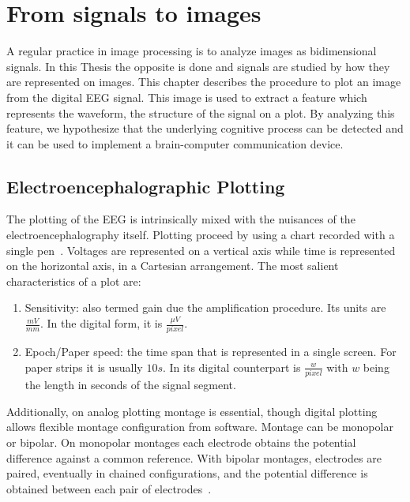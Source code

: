 \chapter{From signals to images}
\label{chapter:two}


A regular practice in image processing is to analyze images as bidimensional signals.  In this Thesis the opposite is done and signals are studied by how they are represented on images. This chapter describes the procedure to plot an image from the digital EEG signal.  This image is used to extract a feature which represents the waveform, the structure of the signal on a plot.  By analyzing this feature, we hypothesize that the underlying cognitive process can be detected and it can be used to implement a brain-computer communication device.

\section{Electroencephalographic Plotting}

The plotting of the EEG is intrinsically mixed with the nuisances of the electroencephalography itself.  Plotting proceed by using a chart recorded with a single pen~\cite{Jestico1977}.   Voltages are represented on a vertical axis while time is represented on the horizontal axis, in a Cartesian arrangement.  The most salient characteristics of a plot are:

\begin{enumerate}
\item Sensitivity: also termed gain due the amplification procedure.  Its units are $ \frac{mV}{mm}$.  In the digital form, it is $\frac{\mu V}{pixel}$.
\item Epoch/Paper speed: the time span that is represented in a single screen.  For paper strips it is usually $10s$.  In its digital counterpart is $ \frac{w}{pixel}$ with $w$ being the length in seconds of the signal segment.
\end{enumerate}

Additionally, on analog plotting montage is essential, though digital plotting allows flexible montage configuration from software.  Montage can be monopolar or bipolar.  On monopolar montages each electrode obtains the potential difference against a common reference. With bipolar montages, electrodes are paired, eventually in chained configurations, and the potential difference is obtained between each pair of electrodes~\cite{EEGIntro}.

